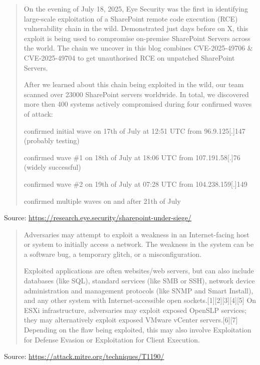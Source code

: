\documentclass[Screen16to9,17pt]{foils}
\begin{document}
\begin{quote}
On the evening of July 18, 2025, Eye Security was the first in identifying large-scale exploitation of a SharePoint remote code execution (RCE) vulnerability chain in the wild. Demonstrated just days before on X, this exploit is being used to compromise on-premise SharePoint Servers across the world. The chain we uncover in this blog combines CVE-2025-49706 \& CVE-2025-49704 to get unauthorised RCE on unpatched SharePoint Servers.

After we learned about this chain being exploited in the wild, our team scanned over 23000 SharePoint servers worldwide. In total, we discovered more then 400 systems actively compromised during four confirmed waves of attack:

\begin{list2}
\item     confirmed initial wave on 17th of July at 12:51 UTC from 96.9.125[.]147 (probably testing)
\item     confirmed wave \#1 on 18th of July at 18:06 UTC from 107.191.58[.]76 (widely successful)
\item     confirmed wave \#2 on 19th of July at 07:28 UTC from 104.238.159[.]149
\item     confirmed multiple waves on and after 21th of July
\end{list2}

\end{quote}
Source: \url{https://research.eye.security/sharepoint-under-siege/}



\begin{quote}
Adversaries may attempt to exploit a weakness in an Internet-facing host or system to initially access a network. The weakness in the system can be a software bug, a temporary glitch, or a misconfiguration.

Exploited applications are often websites/web servers, but can also include databases (like SQL), standard services (like SMB or SSH), network device administration and management protocols (like SNMP and Smart Install), and any other system with Internet-accessible open sockets.[1][2][3][4][5] On ESXi infrastructure, adversaries may exploit exposed OpenSLP services; they may alternatively exploit exposed VMware vCenter servers.[6][7] Depending on the flaw being exploited, this may also involve Exploitation for Defense Evasion or Exploitation for Client Execution.
\end{quote}
Source: \url{https://attack.mitre.org/techniques/T1190/}
\end{document}

